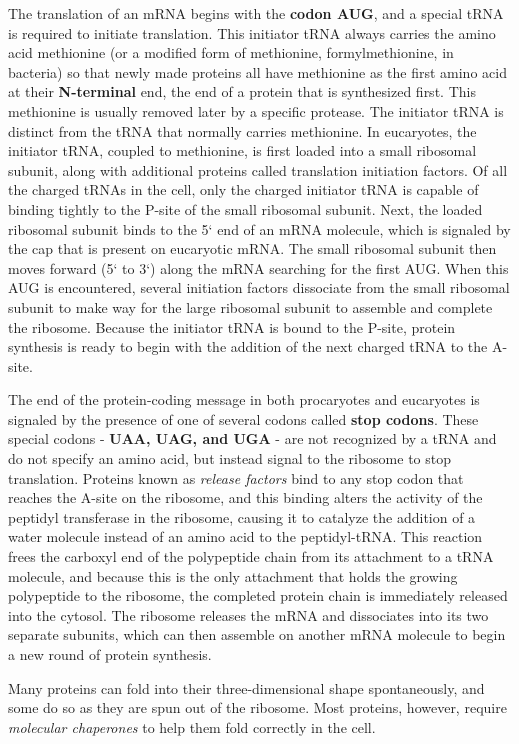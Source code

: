 The translation of an mRNA begins with the \textbf{codon AUG}, and a special
tRNA is required to initiate translation. This initiator tRNA always carries
the amino acid methionine (or a modified form of methionine, formylmethionine,
in bacteria) so that newly made proteins all have methionine
as the first amino acid at their \textbf{N-terminal} end, the end of a protein that
is synthesized first. This methionine is usually removed later by a specific
protease. The initiator tRNA is distinct from the tRNA that normally carries methionine.
In eucaryotes, the initiator tRNA, coupled to methionine, is first loaded into
a small ribosomal subunit, along with additional proteins called translation
initiation factors. Of all the charged tRNAs in the cell,
only the charged initiator tRNA is capable of binding tightly to the P-site
of the small ribosomal subunit. Next, the loaded ribosomal subunit binds
to the 5` end of an mRNA molecule, which is signaled by the cap that is
present on eucaryotic mRNA. The small ribosomal subunit then moves forward
(5` to 3`) along the mRNA searching for the first
AUG. When this AUG is encountered, several initiation factors dissociate
from the small ribosomal subunit to make way for the large ribosomal
subunit to assemble and complete the ribosome. Because the initiator
tRNA is bound to the P-site, protein synthesis is ready to begin with the
addition of the next charged tRNA to the A-site.

The end of the protein-coding message in both procaryotes and eucaryotes
is signaled by the presence of one of several codons called \textbf{stop codons}.
These special codons - \textbf{UAA, UAG, and UGA} - are not
recognized by a tRNA and do not specify an amino acid, but instead signal
to the ribosome to stop translation. Proteins known as \textit{release factors} bind
to any stop codon that reaches the A-site on the ribosome, and this binding
alters the activity of the peptidyl transferase in the ribosome, causing
it to catalyze the addition of a water molecule instead of an amino acid
to the peptidyl-tRNA. This reaction frees the carboxyl end
of the polypeptide chain from its attachment to a tRNA molecule, and
because this is the only attachment that holds the growing polypeptide to
the ribosome, the completed protein chain is immediately released into
the cytosol. The ribosome releases the mRNA and dissociates into its two
separate subunits, which can then assemble on another mRNA molecule
to begin a new round of protein synthesis.

Many proteins can fold into their three-dimensional shape spontaneously,
and some do so as they are spun out of the
ribosome. Most proteins, however, require \textit{molecular chaperones} to help
them fold correctly in the cell.

